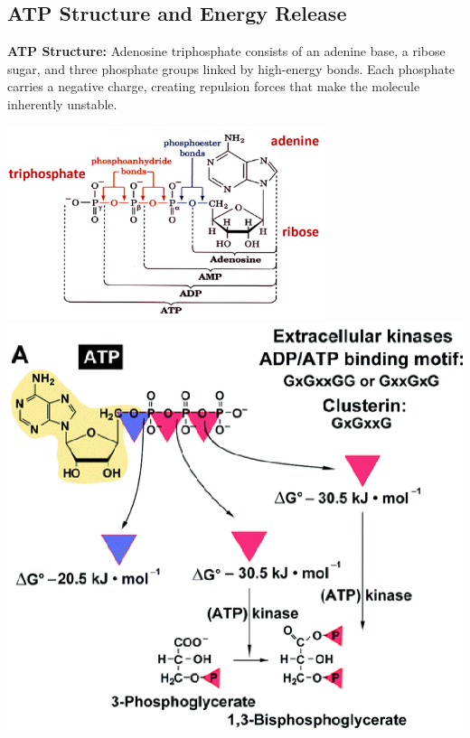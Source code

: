 \documentclass[10pt]{article}
\begin{document}
\subsection*{ATP Structure and Energy Release}
\textbf{ATP Structure:} Adenosine triphosphate consists of an adenine base, a ribose sugar, and three phosphate groups linked by high-energy bonds.  Each phosphate carries a negative charge, creating repulsion forces that make the molecule inherently unstable.
\begin{center} 
	\includegraphics*[width=0.7\textwidth]{L2_5.png}\\
    \includegraphics*[scale=0.6]{L2_6.png}
\end{center}
\end{document}
